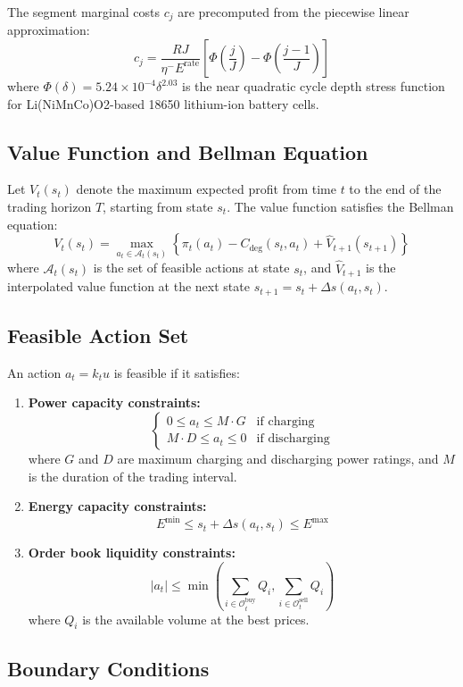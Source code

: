 \documentclass[10pt,twocolumn]{article}
\begin{document}
The segment marginal costs $c_j$ are precomputed from the piecewise linear approximation:
\[
c_j = \frac{R J}{\eta^{-} E^{\text{rate}}} \left[ \Phi\left(\frac{j}{J}\right) - \Phi\left(\frac{j-1}{J}\right) \right]
\]
where $\Phi(\delta) = 5.24 \times 10^{-4} \delta^{2.03}$ is the near quadratic cycle depth stress function for Li(NiMnCo)O2-based 18650 lithium-ion battery cells.

\subsection{Value Function and Bellman Equation}

Let $V_t(s_t)$ denote the maximum expected profit from time $t$ to the end of the trading horizon $T$, starting from state $s_t$. The value function satisfies the Bellman equation:
\[
V_t(s_t) = \max_{a_t \in \mathcal{A}_t(s_t)} \left\{ \pi_t(a_t) - C_{\text{deg}}(s_t, a_t) + \hat{V}_{t+1}(s_{t+1}) \right\}
\]
where $\mathcal{A}_t(s_t)$ is the set of feasible actions at state $s_t$, and $\hat{V}_{t+1}$ is the interpolated value function at the next state $s_{t+1} = s_t + \Delta s(a_t, s_t)$.

\subsection{Feasible Action Set}

An action $a_t = k_t u$ is feasible if it satisfies:

\begin{enumerate}
    \item \textbf{Power capacity constraints:}
    \[
    \begin{cases}
    0 \leq a_t \leq M \cdot G & \text{if charging} \\
    M \cdot D \leq a_t \leq 0 & \text{if discharging}
    \end{cases}
    \]
    where $G$ and $D$ are maximum charging and discharging power ratings, and $M$ is the duration of the trading interval.
    \item \textbf{Energy capacity constraints:}
    \[
    E^{\min} \leq s_t + \Delta s(a_t, s_t) \leq E^{\max}
    \]
    \item \textbf{Order book liquidity constraints:}
    \[
    |a_t| \leq \min\left(\sum_{i \in \mathcal{O}_t^{\text{buy}}} Q_i, \sum_{i \in \mathcal{O}_t^{\text{sell}}} Q_i\right)
    \]
    where $Q_i$ is the available volume at the best prices.
\end{enumerate}
\subsection{Boundary Conditions}
\end{document}

